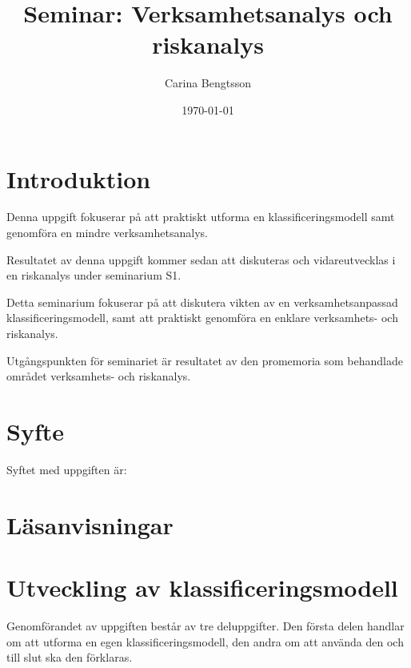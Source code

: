 \documentclass[a4paper]{llncs}
\begin{document}
\title{Seminar: Verksamhetsanalys och riskanalys}
\author{%
  Carina Bengtsson
}
\date{\today}

\maketitle

\section{Introduktion}
\label{sec:introduction}
\noindent
Denna uppgift fokuserar på att praktiskt utforma en klassificeringsmodell samt 
genomföra en mindre verksamhetsanalys.

Resultatet av denna uppgift kommer sedan att diskuteras och vidareutvecklas 
i en riskanalys under seminarium S1.

Detta seminarium fokuserar på att diskutera vikten av en verksamhetsanpassad 
klassificeringsmodell, samt att praktiskt genomföra en enklare verksamhets- och 
riskanalys.

Utgångspunkten för seminariet är resultatet av den promemoria som behandlade 
området verksamhets- och riskanalys.



\section{Syfte}
\label{sec:aim}
\noindent
Syftet med uppgiften är:
\begin{itemize}
  
\end{itemize}

\section{Läsanvisningar}
\noindent



\section{Utveckling av klassificeringsmodell}
\label{sec:work}
\noindent
Genomförandet av uppgiften består av tre deluppgifter.
Den första delen handlar om att utforma en egen klassificeringsmodell, den 
andra om att använda den och till slut ska den förklaras.
\end{document}
